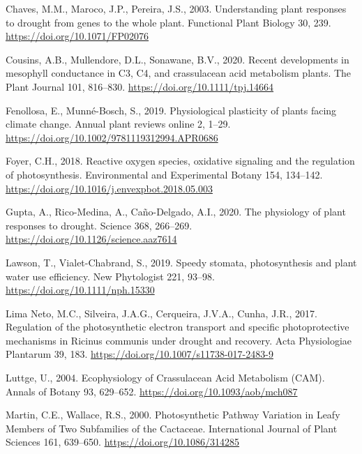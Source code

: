 \documentclass[
  12pt,
  letterpaper,
  DIV=11,
  numbers=noendperiod]{scrartcl}
\newlength{\cslhangindent}
\newlength{\cslentryspacingunit} %
\newenvironment{CSLReferences}[2] %
 {%
  \setlength{\parindent}{0pt}
  \ifodd #1
  \let\oldpar\par
  \def\par{\hangindent=\cslhangindent\oldpar}
  \fi
  \setlength{\parskip}{#2\cslentryspacingunit}
 }%
 {}
\begin{document}
\hypertarget{refs}{}
\begin{CSLReferences}{1}{0}
\leavevmode{}%
Chaves, M.M., Maroco, J.P., Pereira, J.S., 2003. Understanding plant
responses to drought \textemdash{} from genes to the whole plant.
Functional Plant Biology 30, 239. \url{https://doi.org/10.1071/FP02076}

\leavevmode{}%
Cousins, A.B., Mullendore, D.L., Sonawane, B.V., 2020. Recent
developments in mesophyll conductance in C3, C4, and crassulacean acid
metabolism plants. The Plant Journal 101, 816--830.
\url{https://doi.org/10.1111/tpj.14664}

\leavevmode{}%
Fenollosa, E., Munné-Bosch, S., 2019. Physiological plasticity of plants
facing climate change. Annual plant reviews online 2, 1--29.
\url{https://doi.org/10.1002/9781119312994.APR0686}

\leavevmode{}%
Foyer, C.H., 2018. Reactive oxygen species, oxidative signaling and the
regulation of photosynthesis. Environmental and Experimental Botany 154,
134--142. \url{https://doi.org/10.1016/j.envexpbot.2018.05.003}

\leavevmode{}%
Gupta, A., Rico-Medina, A., Caño-Delgado, A.I., 2020. The physiology of
plant responses to drought. Science 368, 266--269.
\url{https://doi.org/10.1126/science.aaz7614}

\leavevmode{}%
Lawson, T., Vialet-Chabrand, S., 2019. Speedy stomata, photosynthesis
and plant water use efficiency. New Phytologist 221, 93--98.
\url{https://doi.org/10.1111/nph.15330}

\leavevmode{}%
Lima Neto, M.C., Silveira, J.A.G., Cerqueira, J.V.A., Cunha, J.R., 2017.
Regulation of the photosynthetic electron transport and specific
photoprotective mechanisms in {Ricinus} communis under drought and
recovery. Acta Physiologiae Plantarum 39, 183.
\url{https://doi.org/10.1007/s11738-017-2483-9}

\leavevmode{}%
Luttge, U., 2004. Ecophysiology of Crassulacean Acid Metabolism (CAM).
Annals of Botany 93, 629--652. \url{https://doi.org/10.1093/aob/mch087}

\leavevmode{}%
Martin, C.E., Wallace, R.S., 2000. Photosynthetic {Pathway Variation} in
{Leafy Members} of {Two Subfamilies} of the {Cactaceae}. International
Journal of Plant Sciences 161, 639--650.
\url{https://doi.org/10.1086/314285}


\end{CSLReferences}
\end{document}
